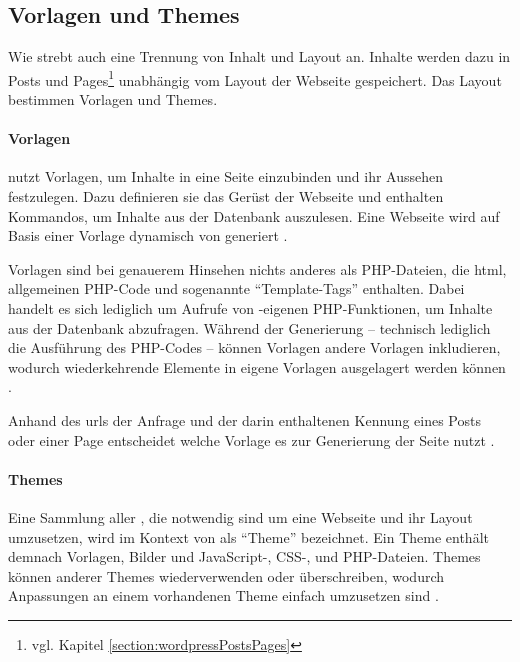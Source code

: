    \subsection{Vorlagen und Themes}
        \label{section:wordpressTemplatesThemes}
        Wie {\imperia} strebt auch {\wordpress} eine Trennung von
        Inhalt und Layout an.
        Inhalte werden dazu in
        Posts und Pages\footnote{vgl. Kapitel \ref{section:wordpressPostsPages}}
        unabhängig vom Layout der Webseite gespeichert.
        Das Layout bestimmen Vorlagen und Themes.

        \paragraph*{Vorlagen}
        {\wordpress} nutzt Vorlagen, um Inhalte in eine Seite einzubinden
        und ihr Aussehen festzulegen.
        Dazu definieren sie das Gerüst der Webseite und enthalten Kommandos,
        um Inhalte aus der Datenbank auszulesen.
        Eine Webseite wird auf Basis einer Vorlage dynamisch von {\wordpress} generiert
        \cite{wordpress:Templates}.

        Vorlagen sind bei genauerem Hinsehen nichts anderes als PHP-Dateien,
        die \gls{html}, allgemeinen PHP-Code und sogenannte
        "`Template-Tags"' enthalten.
        Dabei handelt es sich lediglich um Aufrufe von
        {\wordpress}-eigenen PHP-Funktionen,
        um Inhalte aus der Datenbank abzufragen.
        Während der Generierung -- technisch lediglich die Ausführung
        des PHP-Codes -- können Vorlagen andere Vorlagen inkludieren,
        wodurch wiederkehrende Elemente in eigene Vorlagen ausgelagert
        werden können \cite{wordpress:TemplateFiles}.

        Anhand des \glspl{url} der Anfrage und der darin enthaltenen
        Kennung eines Posts oder einer Page
        entscheidet {\wordpress} welche Vorlage es zur Generierung der Seite nutzt
        \cite{wordpress:TemplateHierarchy}.

        \paragraph*{Themes}
        Eine Sammlung aller {\resources}, die notwendig sind um
        eine Webseite und ihr Layout umzusetzen,
        wird im Kontext von {\wordpress} als "`Theme"' bezeichnet.
        Ein Theme enthält demnach Vorlagen, Bilder und
        JavaScript-, CSS-, und PHP-Dateien.
        Themes können {\resources} anderer Themes wiederverwenden oder überschreiben,
        wodurch Anpassungen an einem vorhandenen Theme einfach umzusetzen sind
        \cite{wordpress:Themes}.

